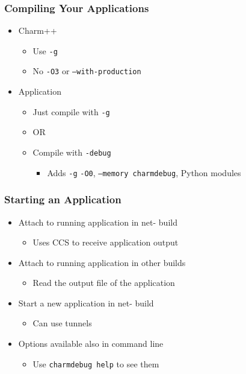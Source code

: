 \begin{frame}[fragile]
  \frametitle{Compiling Your Applications}
  \begin{itemize}
    \item Charm++
      \begin{itemize}
      \item Use \texttt{-g}
      \item No \texttt{­-O3} or \texttt{--with-production}
      \end{itemize}
    \item Application
      \begin{itemize}
      \item Just compile with \texttt{-g}
      \item OR
      \item Compile with \texttt{-debug}
        \begin{itemize}
        \item Adds \texttt{­-g} \texttt{-­O0}, \texttt{--memory charmdebug}, Python
          modules
        \end{itemize}
      \end{itemize}
  \end{itemize}
\end{frame}

\begin{frame}[fragile]
  \frametitle{Starting an Application}
  \begin{itemize}
    \item Attach to running application in net- build
      \begin{itemize}
      \item Uses CCS to receive application output
      \end{itemize}
    \item Attach to running application in other builds
      \begin{itemize}
      \item Read the output file of the application
      \end{itemize}
    \item Start a new application in net- build
      \begin{itemize}
      \item Can use tunnels
      \end{itemize}
    \item Options available also in command line
      \begin{itemize}
      \item Use \verb|charmdebug ­help| to see them
      \end{itemize}
  \end{itemize}
\end{frame}
